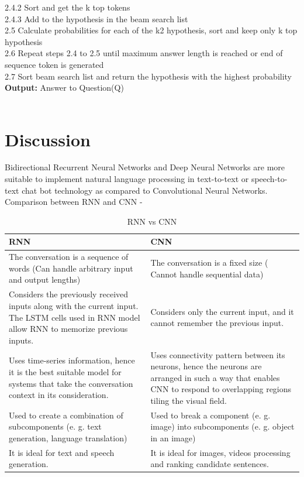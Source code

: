 \documentclass[12pt,a4paper]{report}     %
\begin{document}
\begin{normalsize}
{2.4.2 Sort and get the k top tokens \\
2.4.3 Add to the hypothesis in the beam search list \\
2.5 Calculate probabilities for each of the k2 hypothesis, sort and keep only k top hypothesis \\
2.6 Repeat steps 2.4 to 2.5 until maximum answer length is reached or end of sequence token is generated \\
2.7 Sort beam search list and return the hypothesis with the highest probability\\
{\bf Output:} Answer to Question(Q) \\ \\
\section{Discussion}
{\setlength{\baselineskip}{1.1\baselineskip}
Bidirectional Recurrent Neural Networks and Deep Neural Networks are more suitable to implement natural language processing in text-to-text or speech-to-text chat bot technology as compared to Convolutional Neural Networks. \\
\-\hspace{1cm}Comparison between RNN and CNN - 
\begin{center}
\begin{table}[htp]
\label{RNN vs CNN}
\begin{tabular}{|p{8cm}|p{8cm}|}
\cline{1-2}
RNN  & CNN \\
\hline
The conversation is a sequence of words (Can handle arbitrary input and output lengths) & The conversation is a fixed size ( Cannot handle sequential data) \\
\hline
Considers the previously received inputs along with the current input. The LSTM cells used in RNN model allow RNN to memorize previous inputs. & Considers only the current input, and it cannot remember the previous input. \\
\hline
Uses time-series information, hence it is the best suitable model for systems that take the conversation context in its consideration. & Uses connectivity pattern
between its neurons, hence the neurons are arranged in such a way that enables CNN to respond to overlapping regions tiling the visual field. \\
\hline
Used to create a combination of subcomponents (e. g. text generation, language translation) & Used to break a component (e. g. image) into subcomponents (e. g. object in an image) \\
\hline
It is ideal for text and speech generation. & It is ideal for images, videos processing and ranking candidate sentences. \\
\hline
\end{tabular}
\caption{RNN vs CNN}
\end{table}
\end{center}
}

}
\end{normalsize}
\end{document}
